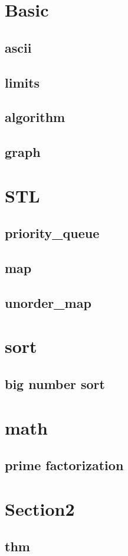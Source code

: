 \section{Basic}
    \subsection{ascii}
        
    \subsection{limits}
        
    \subsection{algorithm}
        
    \subsection{graph}
        

\section{STL}
    \subsection{priority\_queue}
        
    \subsection{map}
        
    \subsection{unorder\_map}
        

\section{sort}
    \subsection{big number sort}
        

\section{math}
        \subsection{prime factorization}
            
  

\section{Section2}
    \subsection{thm}
        